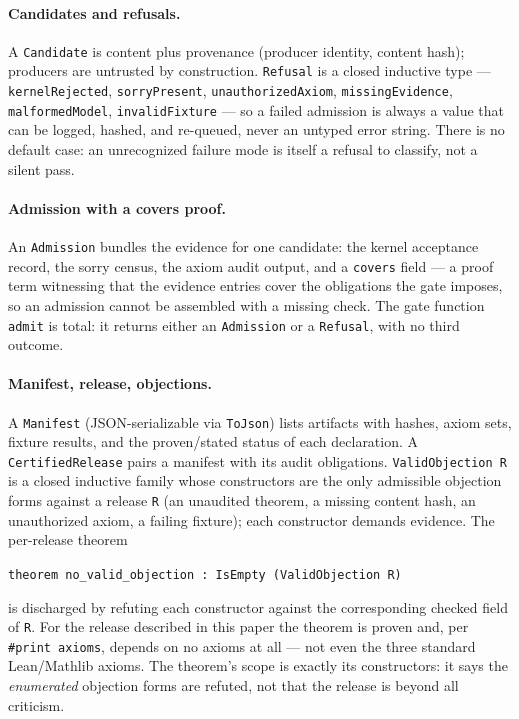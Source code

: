 \documentclass[11pt]{article}
\begin{document}
\paragraph{Candidates and refusals.}
A \texttt{Candidate} is content plus provenance (producer identity, content
hash); producers are untrusted by construction. \texttt{Refusal} is a closed
inductive type --- \texttt{kernelRejected}, \texttt{sorryPresent},
\texttt{unauthorizedAxiom}, \texttt{missingEvidence},
\texttt{malformedModel}, \texttt{invalidFixture} --- so a failed admission is
always a value that can be logged, hashed, and re-queued, never an untyped
error string. There is no default case: an unrecognized failure mode is
itself a refusal to classify, not a silent pass.

\paragraph{Admission with a covers proof.}
An \texttt{Admission} bundles the evidence for one candidate: the kernel
acceptance record, the sorry census, the axiom audit output, and a
\texttt{covers} field --- a proof term witnessing that the evidence entries
cover the obligations the gate imposes, so an admission cannot be assembled
with a missing check. The gate function \texttt{admit} is total: it returns
either an \texttt{Admission} or a \texttt{Refusal}, with no third outcome.

\paragraph{Manifest, release, objections.}
A \texttt{Manifest} (JSON-serializable via \texttt{ToJson}) lists artifacts
with hashes, axiom sets, fixture results, and the proven/stated status of
each declaration. A \texttt{CertifiedRelease} pairs a manifest with its
audit obligations. \texttt{ValidObjection R} is a closed inductive family
whose constructors are the only admissible objection forms against a
release \texttt{R} (an unaudited theorem, a missing content hash, an unauthorized
axiom, a failing fixture); each constructor demands evidence. The
per-release theorem
\begin{center}
\texttt{theorem no\_valid\_objection : IsEmpty (ValidObjection R)}
\end{center}
is discharged by refuting each constructor against the corresponding checked
field of \texttt{R}. For the release described in this paper the theorem is
proven and, per \texttt{\#print axioms}, depends on no axioms at all --- not
even the three standard Lean/Mathlib axioms. The theorem's scope is exactly
its constructors: it says the \emph{enumerated} objection forms are refuted,
not that the release is beyond all criticism.
\end{document}
